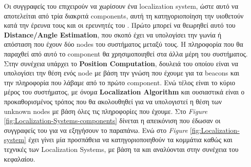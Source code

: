 Οι συγγραφείς του \cite{wsn-Localization-systems} επιχειρούν να χωρίσουν ένα localization system, ώστε 
αυτό να αποτελείται από τρία διακριτά components, αυτή τη κατηγοριοποίηση την υιοθετούν κατά την έρευνα τους και οι ερευνητές του \cite{localization-systems-components}. Πρώτο μπορεί να θεωρηθεί αυτό του \textbf{Distance/Angle Estimation}, 
που σκοπό έχει να υπολογίσει την γωνία ή απόσταση που έχουν δύο nodes του συστήματος μεταξύ τους.
Η πληροφορία που θα παραχθεί από αυτό το component θα χρησιμοποιηθεί στα άλλα μέρη του συστήματος.
Στην συνέχεια υπάρχει το \textbf{Position Computation}, δουλειά του οποίου είναι να υπολογίσει την θέση ενός
node με βάση την γνώση που έχουμε για τα beacons και την πληροφορία που λάβαμε από το πρώτο component.
Ενώ τέλος είναι το κύριο μέρος του συστήματος, με όνομα \textbf{Localization Algorithm} και ουσιαστικά είναι
ο προκαθορισμένος τρόπος που θα ακολουθηθεί για να υπολογιστεί η θέση των unknown nodes με βάση όλες τις 
πληροφορίες που έχουμε.
Στο \emph{Figure} \ref{fig:Localization-Systems-components} δίνεται η απεικόνιση που έδωσαν οι συγγραφείς του 
\cite{wsn-Localization-systems} για να εξηγήσουν το παραπάνω. Ενώ στο \emph{Figure} \ref{fig:Localization-system}
έχει γίνει μία προσπάθεια να κατηγοριοποιηθούν τα κομμάτια καθώς και τεχνικές των Localization Systems,
με βάση τα \cite{farooqiazam2016location} \cite{wsn-Localization-systems} \cite{wsn-Localization-techniques}
και αναλύονται στην συνέχεια του κεφαλαίου.

